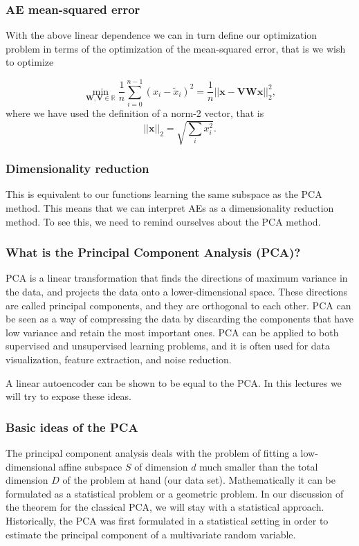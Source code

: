 \documentclass{beamer}
\begin{document}
\begin{frame}
\frametitle{AE mean-squared error}

With the above linear dependence we can in turn define our
optimization problem in terms of the optimization of the mean-squared
error, that is we wish to optimize

\[
\min_{\bm{W},\bm{V}\in {\mathbb{R}}}\frac{1}{n}\sum_{i=0}^{n-1}\left(x_i-\tilde{x}_i\right)^2=\frac{1}{n}\vert\vert \bm{x}-\bm{V}\bm{W}\bm{x}\vert\vert_2^2,
\]
where we have used the definition of  a norm-2 vector, that is
\[
\vert\vert \bm{x}\vert\vert_2 = \sqrt{\sum_i x_i^2}. 
\]
\end{frame}

\begin{frame}
\frametitle{Dimensionality reduction}

This is equivalent to our functions learning the same subspace as
the PCA method. This means that we can interpret AEs as a
dimensionality reduction method.  To see this, we need to remind
ourselves about the PCA method.
\end{frame}

\begin{frame}
\frametitle{What is the Principal Component Analysis (PCA)?}

PCA is a linear transformation that finds the directions of maximum
variance in the data, and projects the data onto a lower-dimensional
space. These directions are called principal components, and they are
orthogonal to each other. PCA can be seen as a way of compressing the
data by discarding the components that have low variance and retain
the most important ones. PCA can be applied to both supervised and
unsupervised learning problems, and it is often used for data
visualization, feature extraction, and noise reduction.

A linear autoencoder can be shown to be equal to the PCA.
In this lectures we will try to expose these ideas.
\end{frame}

\begin{frame}
\frametitle{Basic ideas of the PCA}

The principal component analysis deals with the problem of fitting a
low-dimensional affine subspace $S$ of dimension $d$ much smaller than
the total dimension $D$ of the problem at hand (our data
set). Mathematically it can be formulated as a statistical problem or
a geometric problem.  In our discussion of the theorem for the
classical PCA, we will stay with a statistical approach. 
Historically, the PCA was first formulated in a statistical setting in order to estimate the principal component of a multivariate random variable.
\end{frame}
\end{document}
